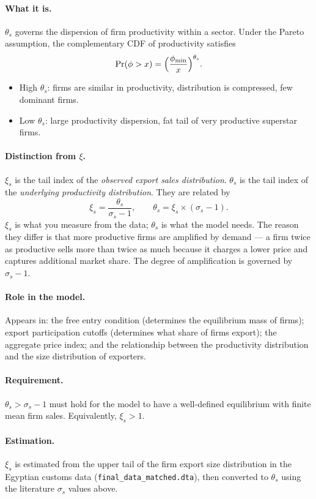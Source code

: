 \documentclass[12pt]{article}
\begin{document}
\paragraph{What it is.}
$\theta_s$ governs the dispersion of firm productivity within a sector.
Under the Pareto assumption, the complementary CDF of productivity satisfies
\[
\Pr(\phi > x) = \Bigl(\frac{\phi_{\min}}{x}\Bigr)^{\theta_s}.
\]
\begin{itemize}
  \item High $\theta_s$: firms are similar in productivity, distribution is
        compressed, few dominant firms.
  \item Low $\theta_s$: large productivity dispersion, fat tail of very
        productive superstar firms.
\end{itemize}

\paragraph{Distinction from $\xi$.}
$\xi_s$ is the tail index of the \emph{observed export sales distribution}.
$\theta_s$ is the tail index of the \emph{underlying productivity
distribution}. They are related by
\[
\xi_s = \frac{\theta_s}{\sigma_s - 1},
\qquad \theta_s = \xi_s \times (\sigma_s - 1).
\]
$\xi_s$ is what you measure from the data; $\theta_s$ is what the model needs.
The reason they differ is that more productive firms are amplified by
demand --- a firm twice as productive sells more than twice as much because
it charges a lower price and captures additional market share. The degree of
amplification is governed by $\sigma_s - 1$.

\paragraph{Role in the model.}
Appears in: the free entry condition (determines the equilibrium mass of
firms); export participation cutoffs (determines what share of firms export);
the aggregate price index; and the relationship between the productivity
distribution and the size distribution of exporters.

\paragraph{Requirement.}
$\theta_s > \sigma_s - 1$ must hold for the model to have a well-defined
equilibrium with finite mean firm sales. Equivalently, $\xi_s > 1$.

\paragraph{Estimation.}
$\xi_s$ is estimated from the upper tail of the firm export size distribution
in the Egyptian customs data (\texttt{final\_data\_matched.dta}), then
converted to $\theta_s$ using the literature $\sigma_s$ values above.
\end{document}
